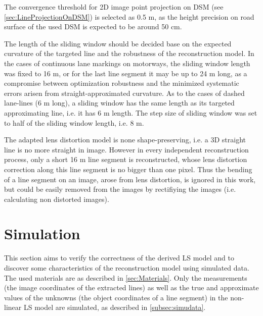 The convergence threshold for 2D image point projection on DSM (see \cref{sec:LineProjectionOnDSM}) is selected as 0.5 m, as the height precision on road surface of the used DSM is expected to be around 50 cm.


The length of the sliding window should be decided base on the expected curvature of the targeted line and the robustness of the reconstruction model. In the cases of continuous lane markings on motorways, the sliding window length was fixed to 16 m, or for the last line segment it may be up to 24 m long, as a compromise between optimization robustness and the minimized systematic errors arisen from straight-approximated curvature. As to the cases of dashed lane-lines (6 m long), a sliding window has the same length as its targeted approximating line, i.e. it has 6 m length. The step size of sliding window was set to half of the sliding window length, i.e. 8 m.









The adapted lens distortion model is none shape-preserving, i.e. a 3D straight line is no more straight in image. However in every independent reconstruction process, only a short 16 m line segment is reconstructed, whose lens distortion correction along this line segment is no bigger than one pixel. Thus the bending of a line segment on an image, arose from lens distortion, is ignored in this work, but could be easily removed from the images by rectifiying the images (i.e. calculating non distorted images).


\section{Simulation}
\label{sec:simulation}
This section aims to verify the correctness of the derived LS model and to discover some characteristics of the reconstruction model using simulated data. The used materials are as described in \cref{sec:Materials}. Only the measurements (the image coordinates of the extracted lines) as well as the true and approximate values of the unknowns (the object coordinates of a line segment) in the non-linear LS model are simulated, as described in \cref{subsec:simudata}.

